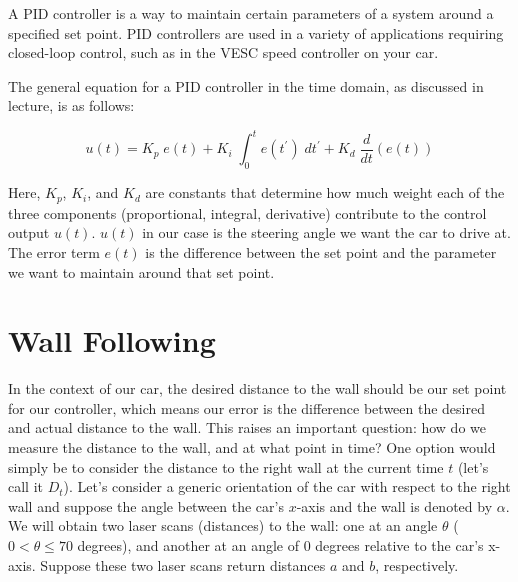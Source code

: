 \documentclass[letta4 paper]{article}
\numberwithin{equation}{section}
\newcommand{\0}{\mathbf{0}}
\begin{document}
	A PID controller is a way to maintain certain parameters of a system around a specified set point. PID controllers are used in a variety of applications requiring closed-loop control, such as in the VESC speed controller on your car.
	
	The general equation for a PID controller in the time domain, as discussed in lecture, is as follows:
	
	\begin{equation*}
	u(t) = K_{p} \; e(t) + K_{i}\; \int_{0}^{t}e(t^{\prime}) \; dt^{\prime} + K_{d}\; \frac{d}{dt}(e(t))
	\end{equation*}
	
	Here, $K_p$, $K_i$, and $K_d$ are constants that determine how much weight each of the three components (proportional, integral, derivative) contribute to the control output $u(t)$. $u(t)$ in our case is the steering angle we want the car to drive at. The error term $e(t)$ is the difference between the set point and the parameter we want to maintain around that set point.
	
	\section{Wall Following}
	
	In the context of our car, the desired distance to the wall should be our set point for our controller, which means our error is the difference between the desired and actual distance to the wall. This raises an important question: how do we measure the distance to the wall, and at what point in time? One option would simply be to consider the distance to the right wall at the current time $t$ (let's call it $D_t$). Let's consider a generic orientation of the car with respect to the right wall and suppose the angle between the car's $x$-axis and the wall is denoted by $\alpha$. We will obtain two laser scans (distances) to the wall: one at an angle $\theta$ ($0 < \theta \leq 70$ degrees), and another at an angle of 0 degrees relative to the car's x-axis. Suppose these two laser scans return distances $a$ and $b$, respectively.\\
	
\end{document}
